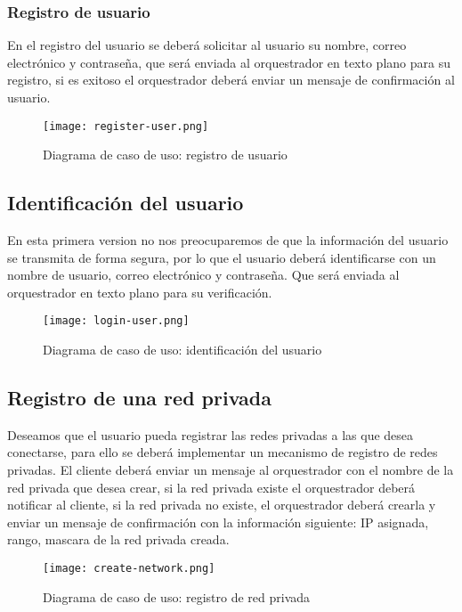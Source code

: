 \subsubsection{Registro de usuario}

En el registro del usuario se deberá solicitar al usuario su nombre, correo electrónico y contraseña, que será enviada al orquestrador en texto plano para su registro, si es exitoso el orquestrador deberá enviar un mensaje de confirmación al usuario.

\begin{figure}[h!]
    \centering
    \texttt{[image: register-user.png]}
    \caption{Diagrama de caso de uso: registro de usuario}
\end{figure}

\subsection{Identificación del usuario}
En esta primera version no nos preocuparemos de que la información del usuario se transmita de forma segura, por lo que el usuario deberá identificarse con un nombre de usuario, correo electrónico y contraseña. Que será enviada al orquestrador en texto plano para su verificación.

\begin{figure}[h!]
    \centering
    \texttt{[image: login-user.png]}
    \caption{Diagrama de caso de uso: identificación del usuario}
\end{figure}


\subsection{Registro de una red privada}

Deseamos que el usuario pueda registrar las redes privadas a las que desea conectarse, para ello se deberá implementar un mecanismo de registro de redes privadas.
El cliente deberá enviar un mensaje al orquestrador con el nombre de la red privada que desea crear, si la red privada existe el orquestrador deberá notificar al cliente, si la red privada no existe, el orquestrador deberá crearla y enviar un mensaje de confirmación con la información siguiente: IP asignada, rango, mascara de la red privada creada.

\begin{figure}[h!]
    \centering
    \texttt{[image: create-network.png]}
    \caption{Diagrama de caso de uso: registro de red privada}
\end{figure}

